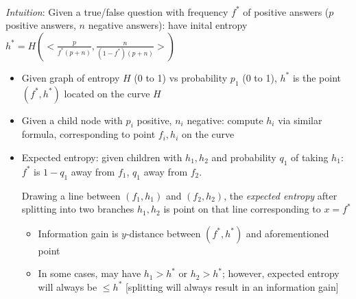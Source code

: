 \documentclass[12pt]{extarticle}
\theoremstyle{definition}
\theoremstyle{remark}
\newcommand{\pstart}[0]{\noindent}
\newcommand{\newp}[0]{~\\ \pstart}
\begin{document}
\newp
\textit{Intuition}: Given a true/false question with frequency $f^\ast$ of positive answers ($p$ positive answers, $n$ negative answers): have inital entropy $h^\ast=H(<\frac{p}{f^\ast(p+n)},\frac{n}{(1-f^\ast)(p+n)}>)$ \begin{itemize}
    \item Given graph of entropy $H$ (0 to 1) vs probability $p_1$ (0 to 1), $h^\ast$ is the point $(f^\ast,h^\ast)$ located on the curve $H$
    \item Given a child node with $p_i$ positive, $n_i$ negative: compute $h_i$ via similar formula, corresponding to point $f_i,h_i$ on the curve
    \item Expected entropy: given children with $h_1,h_2$ and probability $q_1$ of taking $h_1$: $f^\ast$ is $1-q_1$ away from $f_1$, $q_1$ away from $f_2$.
    
    Drawing a line between $(f_1,h_1)$ and $(f_2,h_2)$, the \textit{expected entropy} after splitting into two branches $h_1,h_2$ is point on that line corresponding to $x=f^\ast$ \begin{itemize}
            \item Information gain is $y$-distance between $(f^\ast,h^\ast)$ and aforementioned point
            \item In some cases, may have $h_1>h^\ast$ or $h_2>h^\ast$; however, expected entropy will always be $\leq h^\ast$ [splitting will always result in an information gain]
        \end{itemize}
\end{itemize}
\end{document}
